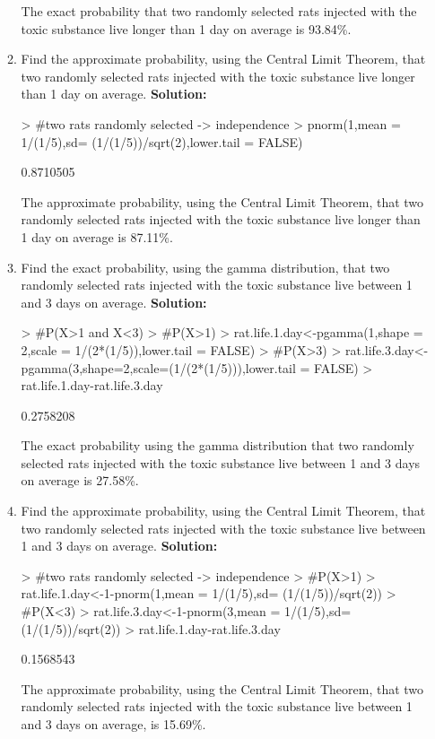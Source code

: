 \documentclass{article}
\begin{document}
\begin{enumerate}
\begin{enumerate}
The exact probability that two randomly selected rats injected with the toxic substance live longer than 1 day on average is 93.84\%.
	  \item Find the approximate probability, using the Central Limit Theorem, that two randomly 
	  selected rats injected with the toxic substance live longer than 1 day on average.
	  \newline
	  \textbf{Solution:}
\begin{Schunk}
\begin{Sinput}
> #two rats randomly selected -> independence
> pnorm(1,mean = 1/(1/5),sd= (1/(1/5))/sqrt(2),lower.tail = FALSE)
\end{Sinput}
\begin{Soutput}
[1] 0.8710505
\end{Soutput}
\end{Schunk}
The approximate probability, using the Central Limit Theorem, that two randomly selected rats injected with the toxic substance live longer than 1 day on average is 87.11\%.
	  \item Find the exact probability, using the gamma distribution, that two randomly selected 
	  rats injected with the toxic substance live  between 1 and 3 days on average.
	  \newline
	  \textbf{Solution:}
\begin{Schunk}
\begin{Sinput}
> #P(X>1 and X<3)
> #P(X>1)
> rat.life.1.day<-pgamma(1,shape = 2,scale = 1/(2*(1/5)),lower.tail = FALSE)
> #P(X>3)
> rat.life.3.day<-pgamma(3,shape=2,scale=(1/(2*(1/5))),lower.tail = FALSE)
> rat.life.1.day-rat.life.3.day
\end{Sinput}
\begin{Soutput}
[1] 0.2758208
\end{Soutput}
\end{Schunk}
The exact probability using the gamma distribution that two randomly selected rats injected with the toxic substance live between 1 and 3 days on average is 27.58\%.
	  \item Find the approximate probability, using the Central Limit Theorem, that two randomly 
	  selected rats injected with the toxic substance live between 1 and 3 days on average.
	  \newline
	  \textbf{Solution:}
\begin{Schunk}
\begin{Sinput}
> #two rats randomly selected -> independence
> #P(X>1)
> rat.life.1.day<-1-pnorm(1,mean = 1/(1/5),sd= (1/(1/5))/sqrt(2))
> #P(X<3)
> rat.life.3.day<-1-pnorm(3,mean = 1/(1/5),sd= (1/(1/5))/sqrt(2))
> rat.life.1.day-rat.life.3.day
\end{Sinput}
\begin{Soutput}
[1] 0.1568543
\end{Soutput}
\end{Schunk}
The approximate probability, using the Central Limit Theorem, that two randomly selected rats injected with the toxic substance live between 1 and 3 days on average, is 15.69\%.
  \end{enumerate}


\end{enumerate}
\end{document}
